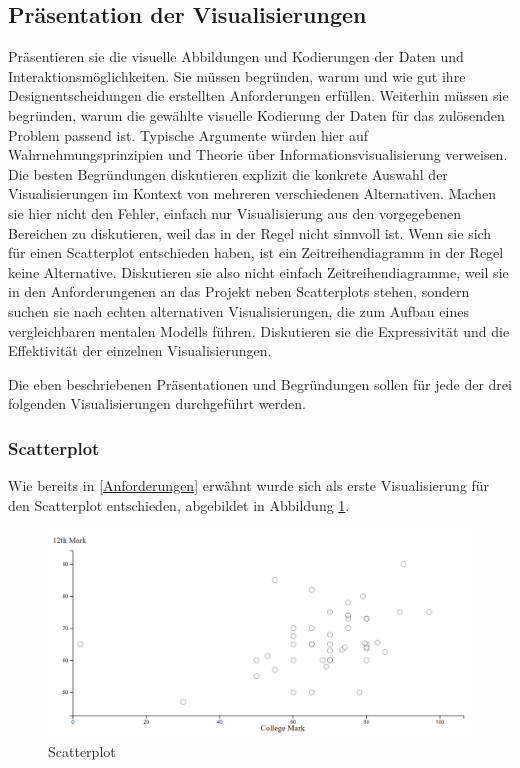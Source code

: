 \documentclass[usegeometry=true]{scrartcl}
\begin{document}
\subsection{Präsentation der Visualisierungen}
Präsentieren sie die visuelle Abbildungen und Kodierungen der Daten und Interaktionsmöglichkeiten. 
Sie müssen  begründen, warum und wie gut ihre Designentscheidungen die erstellten Anforderungen erfüllen. 
Weiterhin müssen sie begründen, warum die gewählte visuelle Kodierung der Daten für das zulösenden Problem passend ist.
Typische Argumente würden hier auf Wahrnehmungsprinzipien und Theorie über Informationsvisualisierung verweisen. 
Die besten Begründungen diskutieren explizit die konkrete Auswahl der Visualisierungen im Kontext von mehreren verschiedenen Alternativen. 
Machen sie hier nicht den Fehler, einfach nur Visualisierung aus den vorgegebenen Bereichen zu diskutieren, weil das in der Regel nicht sinnvoll ist.
Wenn sie sich für einen Scatterplot entschieden haben, ist ein Zeitreihendiagramm in der Regel keine Alternative.
Diskutieren sie also nicht einfach Zeitreihendiagramme, weil sie in den Anforderungenen an das Projekt neben Scatterplots stehen, sondern suchen sie nach echten alternativen Visualisierungen, die zum Aufbau eines vergleichbaren mentalen Modells führen. 
Diskutieren sie die Expressivität und die Effektivität der einzelnen Visualisierungen. 

Die eben beschriebenen Präsentationen und Begründungen sollen für jede der drei folgenden Visualisierungen durchgeführt werden. 


\subsubsection{Scatterplot}
\label{VisEins}
Wie bereits in \ref{Anforderungen} erwähnt wurde sich als erste Visualisierung für den Scatterplot entschieden, abgebildet in Abbildung \ref{Scatter}.



\begin{figure}[h]
\begin{center}
	\includegraphics[scale=0.35]{Scatterplot.png}
	\caption{Scatterplot}
	\label{Scatter}
\end{center}
\end{figure}
\end{document}
